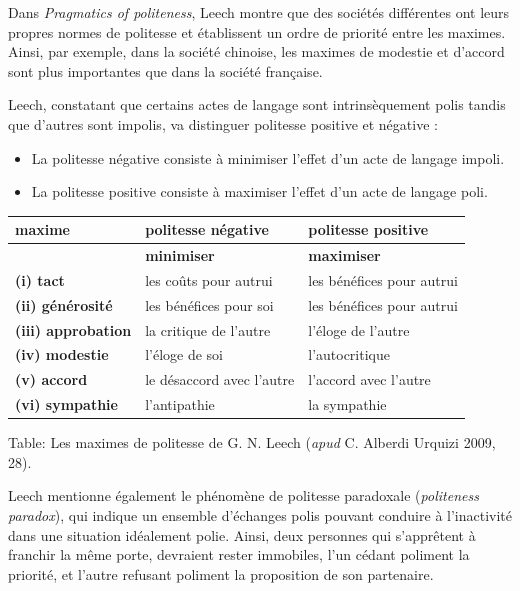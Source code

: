 Dans \textit{Pragmatics of politeness}, Leech montre que des sociétés différentes ont leurs propres normes de politesse et établissent un ordre de priorité entre les maximes. Ainsi, par exemple, dans la société chinoise, les maximes de modestie et d’accord sont plus importantes que dans la société française.

Leech, constatant que certains actes de langage sont intrinsèquement polis tandis que d’autres sont impolis, va distinguer politesse positive et négative :
\begin{itemize}
\item La politesse négative consiste à minimiser l’effet d’un acte de langage impoli.
\item La politesse positive consiste à maximiser l’effet d’un acte de langage poli.
\end{itemize}
\begin{center}
\small
\renewcommand{\arraystretch}{1.22}
\begin{tabularx}{\linewidth}{|>{\raggedright\arraybackslash}p{.25\linewidth}|>{\raggedright\arraybackslash}X|>{\raggedright\arraybackslash}X|}
\hline
\textbf{maxime} & \textbf{politesse négative} & \textbf{politesse positive}\\ \cline{2-3}
 & \textbf{minimiser} & \textbf{maximiser}\\ \hline
\textbf{(i) tact} & les coûts pour autrui & les bénéfices pour autrui\\ \hline
\textbf{(ii) générosité} & les bénéfices pour soi & les bénéfices pour autrui\\ \hline
\textbf{(iii) approbation} & la critique de l’autre & l’éloge de l’autre\\ \hline
\textbf{(iv) modestie} & l’éloge de soi & l’autocritique\\ \hline
\textbf{(v) accord} & le désaccord avec l’autre & l’accord avec l’autre\\ \hline
\textbf{(vi) sympathie} & l’antipathie & la sympathie\\ \hline
\end{tabularx}
\end{center}
Table: Les maximes de politesse de G. N. Leech (\textit{apud} C. Alberdi Urquizi 2009, 28).

Leech mentionne également le phénomène de politesse paradoxale (\textit{politeness paradox}), qui indique un ensemble d’échanges polis pouvant conduire à l’inactivité dans une situation idéalement polie. Ainsi, deux personnes qui s’apprêtent à franchir la même porte, devraient rester immobiles, l’un cédant poliment la priorité, et l’autre refusant poliment la proposition de son partenaire.

